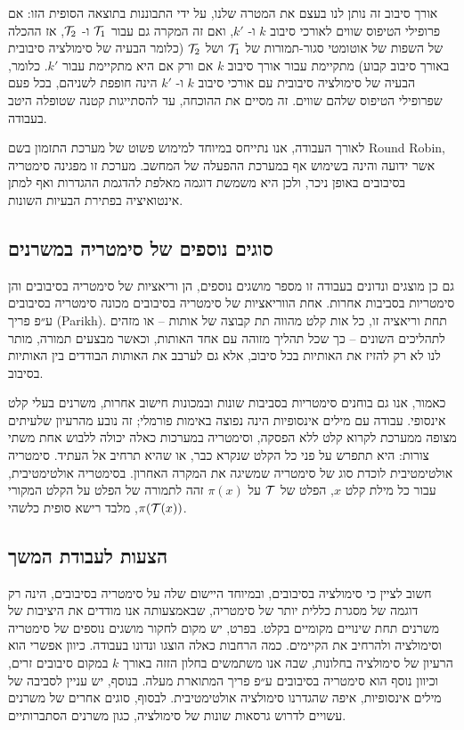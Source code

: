 {אורך סיבוב זה נותן לנו בעצם את המטרה שלנו, על ידי התבוננות בתוצאה הסופית הזו: אם פרופילי הטיפוס שווים לאורכי סיבוב
$k$
ו-
$k'$,
 ואם זה המקרה גם עבור
$\mathcal{T}_1$
ו-
$\mathcal{T}_2$,
אז ההכלה של השפות של אוטומטי סגור-תמורות של
$\mathcal{T}_1$
ושל
$\mathcal{T}_2$
(כלומר הבעיה של סימולציה סיבובית באורך סיבוב קבוע) מתקיימת עבור אורך סיבוב
$k$
אם ורק אם היא מתקיימת עבור
$k'$.
 כלומר, הבעיה של סימולציה סיבובית עם אורכי סיבוב
$k$
ו-
$k'$
הינה חופפת לשניהם, בכל פעם שפרופילי הטיפוס שלהם שווים. זה מסיים את ההוכחה, עד להסתייגות קטנה שטופלה היטב בעבודה.

לאורך העבודה, אנו נתייחס במיוחד למימוש פשוט של מערכת התזמון בשם 
\textenglish{Round Robin},
אשר ידועה והינה בשימוש אף במערכת ההפעלה של המחשב. מערכת זו מפגינה סימטריה בסיבובים באופן ניכר, ולכן היא משמשת דוגמה מאלפת להדגמת ההגדרות ואף למתן אינטואיציה בפתירת הבעיות השונות.

\subsection*{\texthebrew{סוגים נוספים של סימטריה במשרנים}}

גם כן מוצגים ונדונים בעבודה זו מספר מושגים נוספים, הן וריאציות של סימטריה בסיבובים והן סימטריות בסביבות אחרות. אחת הווריאציות של סימטריה בסיבובים מכונה סימטריה בסיבובים ע״פ פריך 
(\textenglish{Parikh}).
תחת וריאציה זו, כל אות קלט מהווה תת קבוצה של אותות – או מזהים לתהליכים השונים – כך שכל תהליך מזוהה עם אחד האותות, וכאשר מבצעים תמורה, מותר לנו לא רק להזיז את האותיות בכל סיבוב, אלא גם לערבב את האותות הבודדים בין האותיות בסיבוב.

כאמור, אנו גם בוחנים סימטריות בסביבות שונות ובמכונות חישוב אחרות, משרנים בעלי קלט אינסופי. עבודה עם מילים אינסופיות הינה נפוצה באימות פורמלי; זה נובע מהרעיון שלעיתים מצופה ממערכת לקרוא קלט ללא הפסקה, וסימטריה במערכות כאלה יכולה ללבוש אחת משתי צורות: היא תתפרש על פני כל הקלט שנקרא כבר, או שהיא תרחיב אל העתיד. סימטריה אולטימטיבית לוכדת סוג של סימטריה שמשיגה את המקרה האחרון. בסימטריה אולטימטיבית, עבור כל מילת קלט
$x$,
הפלט של
$\mathcal{T}$
על
$\pi(x)$
זהה לתמורה של הפלט על הקלט המקורי
$\pi(\mathcal{T}(x))$,
מלבד רישא סופית כלשהי.

\subsection*{\texthebrew{הצעות לעבודת המשך}}

חשוב לציין כי סימולציה בסיבובים, ובמיוחד היישום שלה על סימטריה בסיבובים, הינה רק דוגמה של מסגרת כללית יותר של סימטריה, שבאמצעותה אנו מודדים את היציבות של משרנים תחת שינויים מקומיים בקלט.
בפרט,
יש מקום לחקור מושגים נוספים של סימטריה וסימולציה
ולהרחיב את הקיימים. 
כמה הרחבות כאלה הוצגו ונדונו בעבודה.
כיוון אפשרי הוא הרעיון של סימולציה בחלונות, שבה אנו משתמשים בחלון הזזה באורך
$k$
במקום סיבובים זרים, וכיוון נוסף הוא סימטריה בסיבובים ע״פ פריך המתוארת מעלה. בנוסף, יש עניין לסביבה של מילים אינסופיות, איפה שהגדרנו סימולציה אולטימטיבית. לבסוף, סוגים אחרים של משרנים עשויים לדרוש גרסאות שונות של סימולציה, כגון משרנים הסתברותיים. 

}
